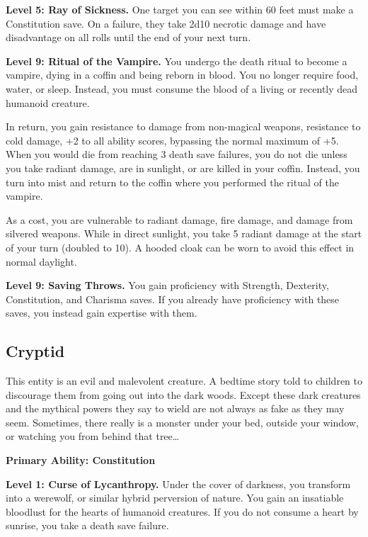 \documentclass[12pt,letterpaper,twocolumn,openany,nodeprecatedcode,bg=none]{dndbook}
\let\oldsubsection\subsection
\renewcommand{\subsection}[1]{%
  \needspace{5\baselineskip}%
  \oldsubsection{#1}%
}
\begin{document}
\textbf{Level 5: Ray of Sickness.} One target you can see within 60 feet
must make a Constitution save. On a failure, they take 2d10 necrotic
damage and have disadvantage on all rolls until the end of your next
turn.

\textbf{Level 9: Ritual of the Vampire.} You undergo the death ritual to
become a vampire, dying in a coffin and being reborn in blood. You no
longer require food, water, or sleep. Instead, you must consume the
blood of a living or recently dead humanoid creature.

In return, you gain resistance to damage from non-magical weapons,
resistance to cold damage, +2 to all ability scores, bypassing the
normal maximum of +5. When you would die from reaching 3 death save
failures, you do not die unless you take radiant damage, are in
sunlight, or are killed in your coffin. Instead, you turn into mist and
return to the coffin where you performed the ritual of the vampire.

As a cost, you are vulnerable to radiant damage, fire damage, and damage
from silvered weapons. While in direct sunlight, you take 5 radiant
damage at the start of your turn (doubled to 10). A hooded cloak can be
worn to avoid this effect in normal daylight.

\textbf{Level 9: Saving Throws.} You gain proficiency with Strength,
Dexterity, Constitution, and Charisma saves. If you already have
proficiency with these saves, you instead gain expertise with them.

\clearpage

\subsection{Cryptid}\label{cryptid}

This entity is an evil and malevolent creature. A bedtime story told to
children to discourage them from going out into the dark woods. Except
these dark creatures and the mythical powers they say to wield are not
always as fake as they may seem. Sometimes, there really is a monster
under your bed, outside your window, or watching you from behind that
tree\ldots{}

\textbf{Primary Ability: Constitution}

\textbf{Level 1: Curse of Lycanthropy.} Under the cover of darkness, you
transform into a werewolf, or similar hybrid perversion of nature. You
gain an insatiable bloodlust for the hearts of humanoid creatures. If
you do not consume a heart by sunrise, you take a death save failure.
\end{document}
